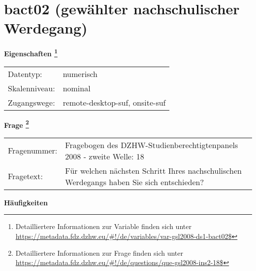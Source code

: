 
    \setcounter{footnote}{0}

    \vspace*{-1.8cm}
	\section{bact02 (gewählter nachschulischer Werdegang)}
	\label{section:bact02}



    \vspace*{0.5cm}
    \noindent\textbf{Eigenschaften
	\footnote{Detailliertere Informationen zur Variable finden sich unter
		\url{https://metadata.fdz.dzhw.eu/\#!/de/variables/var-gsl2008-ds1-bact02$}}}\\
	\begin{tabularx}{\hsize}{@{}lX}
	Datentyp: & numerisch \\
	Skalenniveau: & nominal \\
	Zugangswege: &
	  remote-desktop-suf, 
	  onsite-suf
 \\
    \end{tabularx}



				\vspace*{0.5cm}
                \noindent\textbf{Frage
	                \footnote{Detailliertere Informationen zur Frage finden sich unter
		              \url{https://metadata.fdz.dzhw.eu/\#!/de/questions/que-gsl2008-ins2-18$}}}\\
				\begin{tabularx}{\hsize}{@{}lX}
					Fragenummer: &
					  Fragebogen des DZHW-Studienberechtigtenpanels 2008 - zweite Welle:
					  18
 \\
					Fragetext: & Für welchen nächsten Schritt Ihres nachschulischen Werdegangs haben Sie sich entschieden? \\
				\end{tabularx}





        		\vspace*{0.5cm}
                \noindent\textbf{Häufigkeiten}

